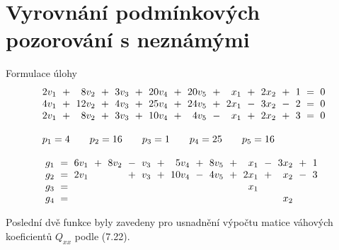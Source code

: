 %
% 
% 
% 
% 
%

\section*{Vyrovnání podmínkových pozorování s neznámými}

\begin{Example}{Formulace úlohy}
\begin{align*}
\arraycolsep=3pt
\begin{array}{rrrrrrrrrrrrrrrrr}
   2v_1 &+&  8v_2 &+& 3v_3 &+& 20v_4 &+& 20v_5 &+&  x_1 &+& 2x_2 &+& 1 &=& 0 \\
   4v_1 &+& 12v_2 &+& 4v_3 &+& 25v_4 &+& 24v_5 &+& 2x_1 &-& 3x_2 &-& 2 &=& 0 \\
   2v_1 &+&  8v_2 &+& 3v_3 &+& 10v_4 &+&  4v_5 &-&  x_1 &+& 2x_2 &+& 3 &=& 0 \\
   \\
   \multicolumn{17}{l}
     {p_1=4\qquad p_2=16\qquad p_3=1\qquad p_4=25\qquad p_5=16} \\
   \\
   \multicolumn{17}{l}{
   \begin{array}{rrrrrrrrrrrrrrrrr}
     g_1  &=& 6v_1 &+& 8v_2 &-& v_3 &+&  5v_4 &+& 8v_5 &+&  x_1 &-& 3x_2 &+& 1\\
     g_2  &=& 2v_1 & &      &+& v_3 &+& 10v_4 &-& 4v_5 &+& 2x_1 &+&  x_2 &-& 3\\
     g_3  &=&      & &      & &     & &      & &      & &  x_1 & &      & &  \\
     g_4  &=&      & &      & &     & &      & &      & &      & &  x_2 & &  \\
   \end{array}}
\end{array}
\end{align*}
\end{Example}

\noindent
Poslední dvě funkce byly zavedeny pro usnadnění výpočtu matice
váhových koeficientů $Q_{xx}$ podle (7.22).

